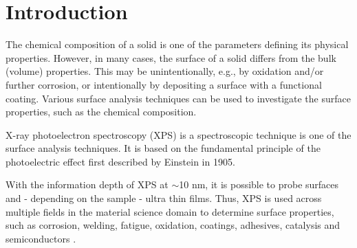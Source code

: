 



\chapter{Introduction} %
\label{Chapter1} %


\newcommand{\keyword}[1]{\textbf{#1}}
\newcommand{\tabhead}[1]{\textbf{#1}}
\newcommand{\code}[1]{\texttt{#1}}
\newcommand{\file}[1]{\texttt{\bfseries#1}}
\newcommand{\option}[1]{\texttt{\itshape#1}}





The chemical composition of a solid is one of the parameters defining its physical properties. However, in many cases, the surface of a solid differs from the bulk (volume) properties. This may be unintentionally, e.g., by oxidation and/or further corrosion, or intentionally by depositing a surface with a functional coating. 
Various surface analysis techniques can be used to investigate the surface properties, such as the chemical composition.


X-ray photoelectron spectroscopy (XPS) is a spectroscopic technique is one of the surface analysis techniques. It is based on the fundamental principle of the photoelectric effect first described by Einstein \cite{einstein_uber_1905} in 1905. 


With the information depth of XPS at $\sim$10 nm, it is possible to probe surfaces and - depending on the sample - ultra thin films.
Thus, XPS is used across multiple fields in the material science domain to determine surface properties, such as corrosion, welding, fatigue, oxidation, coatings, adhesives, catalysis and semiconductors \cite{noauthor_x-ray_nodate}.



